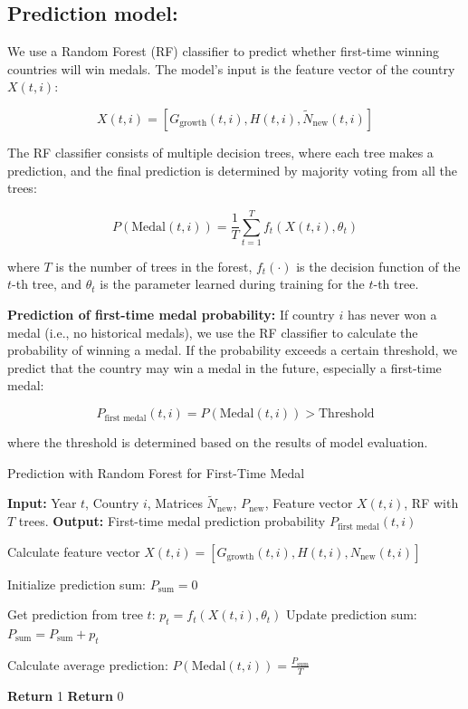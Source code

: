 \documentclass{mcmthesis}
\begin{document}
	
	
	
	

\subsection{Prediction model:}  
We use a Random Forest (RF) classifier to predict whether first-time winning countries will win medals. The model’s input is the feature vector of the country \( X(t,i) \):

\[
X(t,i) = [G_{\text{growth}}(t,i), H(t,i), \tilde{N}_{\text{new}}(t,i)]
\]

The RF classifier consists of multiple decision trees, where each tree makes a prediction, and the final prediction is determined by majority voting from all the trees:

\[
P(\text{Medal}(t,i)) = \frac{1}{T} \sum_{t=1}^{T} f_t(X(t,i), \theta_t)
\]

where \( T \) is the number of trees in the forest, \( f_t(\cdot) \) is the decision function of the \( t \)-th tree, and \( \theta_t \) is the parameter learned during training for the \( t \)-th tree.

\textbf{Prediction of first-time medal probability:}  
If country \( i \) has never won a medal (i.e., no historical medals), we use the RF classifier to calculate the probability of winning a medal. If the probability exceeds a certain threshold, we predict that the country may win a medal in the future, especially a first-time medal:

\[
P_{\text{first medal}}(t,i) = P(\text{Medal}(t,i)) > \text{Threshold}
\]

where the threshold is determined based on the results of model evaluation.
\begin{algorithm}
	\caption{Prediction with Random Forest for First-Time Medal}
	\begin{algorithmic}[1]
		\State \textbf{Input:} Year \( t \), Country \( i \), Matrices \( \tilde{N}_{\text{new}} \), \( P_{\text{new}} \), Feature vector \( X(t,i) \), RF with \( T \) trees.
		\State \textbf{Output:} First-time medal prediction probability \( P_{\text{first medal}}(t,i) \)
		
		\State Calculate feature vector \( X(t,i) = [G_{\text{growth}}(t,i), H(t,i), N_{\text{new}}(t,i)] \)
		
		\State Initialize prediction sum: \( P_{\text{sum}} = 0 \)
		
		\State Get prediction from tree \( t \): \( p_t = f_t(X(t,i), \theta_t) \)
		\State Update prediction sum: \( P_{\text{sum}} = P_{\text{sum}} + p_t \)
		\EndFor
		
		\State Calculate average prediction: \( P(\text{Medal}(t,i)) = \frac{P_{\text{sum}}}{T} \)
		
		\State \textbf{Return} 1 
		\Else
		\State \textbf{Return} 0 
		\EndIf
	\end{algorithmic}
\end{algorithm}
\end{document}
